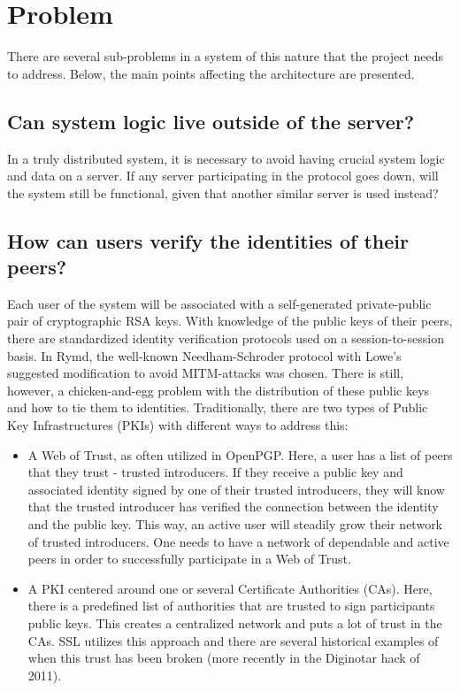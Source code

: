 \section{Problem}
There are several sub-problems in a system of this nature that the project needs to address. Below, the main points affecting the architecture are presented.
\subsection{Can system logic live outside of the server?}
In a truly distributed system, it is necessary to avoid having crucial system logic and data on a server. If any server participating in the protocol goes down, will the system still be functional, given that another similar server is used instead?
\subsection{How can users verify the identities of their peers?}
Each user of the system will be associated with a self-generated private-public pair of cryptographic RSA keys. With knowledge of the public keys of their peers, there are standardized identity verification protocols used on a session-to-session basis. In Rymd, the well-known Needham-Schroder protocol with Lowe's suggested modification to avoid MITM-attacks was chosen. There is still, however, a chicken-and-egg problem with the distribution of these public keys and how to tie them to identities. Traditionally, there are two types of Public Key Infrastructures (PKIs) with different ways to address this:
\begin{itemize}
\item A Web of Trust, as often utilized in OpenPGP. Here, a user has a list of peers that they trust - trusted introducers. If they receive a public key and associated identity signed by one of their trusted introducers, they will know that the trusted introducer has verified the connection between the identity and the public key. This way, an active user will steadily grow their network of trusted introducers. One needs to have a network of dependable and active peers in order to successfully participate in a Web of Trust.
\item A PKI centered around one or several Certificate Authorities (CAs). Here, there is a predefined list of authorities that are trusted to sign participants public keys. This creates a centralized network and puts a lot of trust in the CAs. SSL utilizes this approach and there are several historical examples of when this trust has been broken (more recently in the Diginotar hack of 2011).
\end{itemize}
